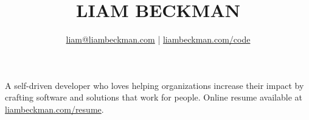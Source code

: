 \title{\textcolor{my-red}{LIAM BECKMAN}}
\author{
    \textcolor{my-blue}{\href{mailto:liam@liambeckman.com}{liam@liambeckman.com}} | \textcolor{my-blue}{\href{https://liambeckman.com/code}{liambeckman.com/code}}
}

\date{\vspace{-5ex}}



\maketitle

\begin{center}
A self-driven developer who loves helping organizations increase their impact by crafting software and solutions that work for people.
Online resume available at \textcolor{my-blue}{\href{https://liambeckman.com/resume}{liambeckman.com/resume}}.
\end{center}

